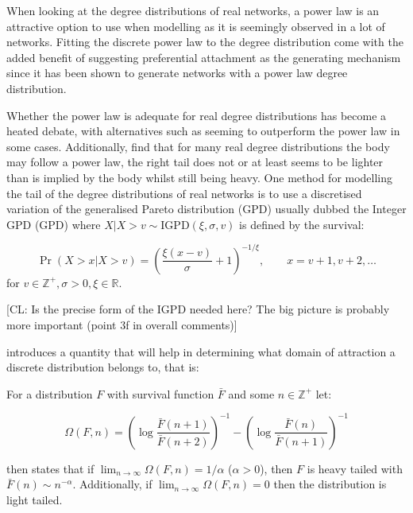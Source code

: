 \documentclass[
  sn-basic,
]{sn-jnl}
\theoremstyle{plain}
\theoremstyle{remark}
\begin{document}
When looking at the degree distributions of real networks, a power law
is an attractive option to use when modelling as it is seemingly
observed in a lot of networks. Fitting the discrete power law to the
degree distribution come with the added benefit of suggesting
preferential attachment as the generating mechanism since it has been
shown to generate networks with a power law degree distribution.

Whether the power law is adequate for real degree distributions has
become a heated debate, with alternatives such as \citet{Broido_2019}
seeming to outperform the power law in some cases. Additionally,
\citet{lef24} find that for many real degree distributions the body may
follow a power law, the right tail does not or at least seems to be
lighter than is implied by the body whilst still being heavy. One method
for modelling the tail of the degree distributions of real networks is
to use a discretised variation of the generalised Pareto distribution
(GPD) usually dubbed the Integer GPD (GPD) where
\(X|X>v \sim \mathrm{IGPD}(\xi,\sigma,v)\) is defined by the survival:

\[
\Pr(X> x|X> v) = \left(\frac{\xi(x-v)}{\sigma} + 1\right)^{-1/\xi},\qquad x=v+1,v+2,\ldots
\] for \(v\in\mathbb Z^+, \sigma>0,\xi\in \mathbb R\).

{[}CL: Is the precise form of the IGPD needed here? The big picture is
probably more important (point 3f in overall comments){]}

\citet{shimura12} introduces a quantity that will help in determining
what domain of attraction a discrete distribution belongs to, that is:

For a distribution \(F\) with survival function \(\bar F\) and some
\(n\in\mathbb Z^+\) let:

\[
\Omega(F,n) = \left(\log\displaystyle\frac{\bar F (n+1)}{\bar F (n+2)}\right)^{-1} - \left(\log\displaystyle\frac{\bar F (n)}{\bar F (n+1)}\right)^{-1}
\]

\citet{shimura12} then states that if
\(\lim_{n\rightarrow\infty} \Omega(F,n) = 1/\alpha\) (\(\alpha>0\)),
then \(F\) is heavy tailed with \(\bar F(n) \sim n^{-\alpha}\).
Additionally, if \(\lim_{n\rightarrow\infty} \Omega(F,n) = 0\) then the
distribution is light tailed.

\citep[CL: The results of][ could be moved closer to Proposition 2.1. In
the introduction, if you want to include \citet{shimura12}, you can
mention the paper in passing, when outlining your approach, e.g.~``Using
the results by \citet{shimura12}, we derive the tail index / heaviness
of the limiting degree distribution of the GPA model \citep{rudas07}.
This informs us the precise class of preference functions that result in
flexible heavy tail.'']{shimura12}
\end{document}
